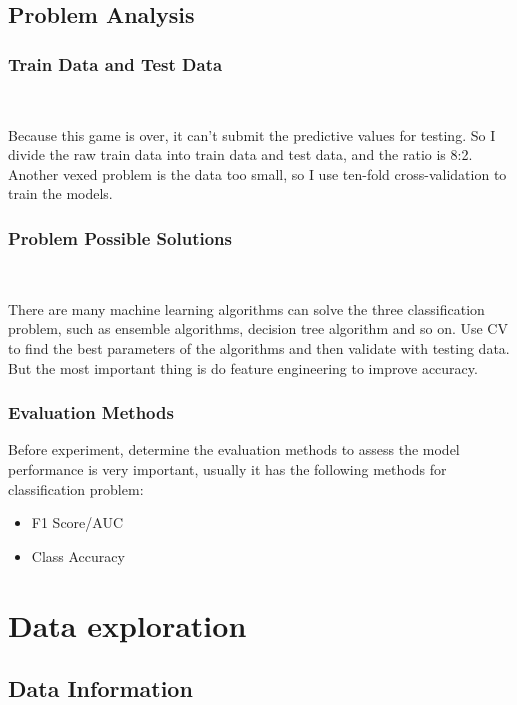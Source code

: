 \subsection{Problem Analysis}

\subsubsection{Train Data and Test Data}
\

Because this game is over, 
it can't submit the predictive values for testing. 
So I divide the raw train data into train data and test data, 
and the ratio is 8:2. 
Another vexed problem is the data too small, 
so I use ten-fold cross-validation 
to train the models.


\subsubsection{Problem Possible Solutions}
\

There are many machine learning algorithms 
can solve the three classification problem,
such as ensemble algorithms,
decision tree algorithm and so on.
Use CV to find the best parameters of the algorithms 
and then validate with testing data.
But the most important thing is 
do  feature engineering to improve accuracy. 


\subsubsection{Evaluation Methods}


Before experiment, determine the evaluation methods
to assess the model performance is very important,
usually it has the following methods
for classification problem:

\begin{itemize}
	\item F1 Score/AUC
	\item Class Accuracy
\end{itemize} 


\section{Data exploration} \label{sec-data_exploration}

\subsection{Data Information}
\

